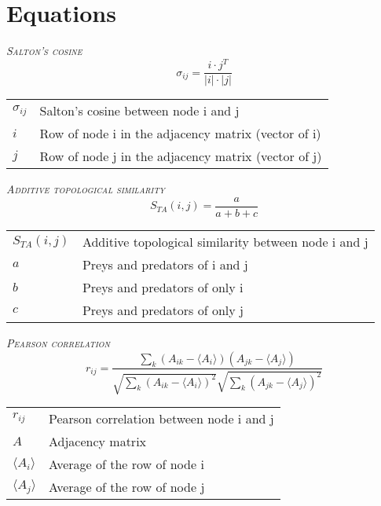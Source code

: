 \documentclass{article}
\makeatletter
\newenvironment{conditions}
  {\par\vspace{\abovedisplayskip}\noindent\begin{tabular}{>{$}l<{$} @{${}={}$} l}}
  {\end{tabular}\par\vspace{\belowdisplayskip}}
\makeatother
\begin{document}
\section{Equations}



\bigskip
\noindent \textrm{\textsc{\textsl{Salton's cosine}}} 
\begin{equation}
	\sigma_{ij} = \frac{i \cdot j^T}{|i| \cdot |j|}
        \label{eqn:Cosine}
\end{equation}
    \begin{conditions}
	    \sigma_{ij} & Salton's cosine between node i and j \\
        i & Row of node i in the adjacency matrix (vector of i)\\
        j & Row of node j in the adjacency matrix (vector of j)\\
    \end{conditions}
	

\bigskip
\noindent \textrm{\textsc{\textsl{Additive topological similarity}}} 
\begin{equation}
    S_{TA}(i,j)=\frac{a}{a+b+c}
        \label{eqn:jaccard_index}
\end{equation}
    \begin{conditions}
        S_{TA}(i,j) & Additive topological similarity between node i and j \\
        a & Preys and predators of i and j \\
        b & Preys and predators of only i \\
        c & Preys and predators of only j \\
    \end{conditions}


\bigbreak
\noindent \textrm{\textsc{\textsl{Pearson correlation}}} 	
\begin{equation}
	r_{ij} = \frac {\sum_k (A_{ik} - \langle A_i \rangle) (A_{jk} - \langle A_j \rangle)}  {\sqrt{\sum_k(A_{ik}- \langle A_i \rangle )^2} \sqrt{\sum_k(A_{jk}- \langle A_j \rangle )^2}}
        \label{eqn:pearson_correlation}
\end{equation}
    \begin{conditions}
	    r_{ij} & Pearson correlation between node i and j \\
	    A & Adjacency matrix \\
	    \langle A_i \rangle & Average of the row of node i \\
	    \langle A_j \rangle & Average of the row of node j \\
    \end{conditions}
	
\end{document}
